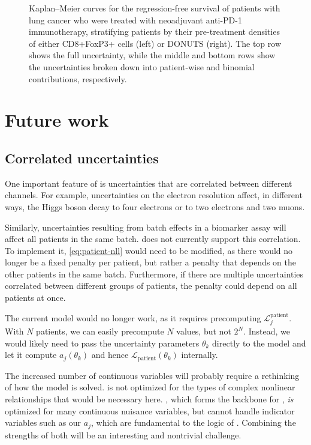 \documentclass[article]{jss}
\newcommand{\KM}{Kaplan--Meier} %
\begin{document}
\begin{figure}[p]
\begin{subfigure}[t]{\figwidth}
    \caption{\label{fig:lung-dataset-donuts-binomial}}
  \end{subfigure}
  \caption{\label{fig:lung-dataset} \KM{} curves for the regression-free survival of patients with lung cancer who were treated with neoadjuvant anti-PD-1 immunotherapy, stratifying patients by their pre-treatment densities of either CD8+FoxP3+ cells (left) or DONUTS (right).  The top row shows the full uncertainty, while the middle and bottom rows show the uncertainties broken down into patient-wise and binomial contributions, respectively.}
\end{figure}

\section{Future work}

\subsection{Correlated uncertainties}

One important feature of  is uncertainties that are correlated between different channels. For example, uncertainties on the electron resolution affect, in different ways, the Higgs boson decay to four electrons or to two electrons and two muons.

Similarly, uncertainties resulting from batch effects in a biomarker assay will affect all patients in the same batch\@.  does not currently support this correlation. To implement it, \cref{eq:patient-nll} would need to be modified, as there would no longer be a fixed penalty per patient, but rather a penalty that depends on the other patients in the same batch. Furthermore, if there are multiple uncertainties correlated between different groups of patients, the penalty could depend on all patients at once.

The current  model would no longer work, as it requires precomputing \(\mathcal{L}_j^{\text{patient}}\). With \(N\) patients, we can easily precompute \(N\) values, but not \(2^N\). Instead, we would likely need to pass the uncertainty parameters \(\theta_k\) directly to the  model and let it compute \(a_j\left(\theta_k\right)\) and hence \(\mathcal{L}_{\text{patient}}\left(\theta_k\right)\) internally.

The increased number of continuous variables will probably require a rethinking of how the model is solved\@.  is not optimized for the types of complex nonlinear relationships that would be necessary here\@. , which forms the backbone for , \emph{is} optimized for many continuous nuisance variables, but cannot handle indicator variables such as our \(a_j\), which are fundamental to the logic of . Combining the strengths of both will be an interesting and nontrivial challenge.
\end{document}
